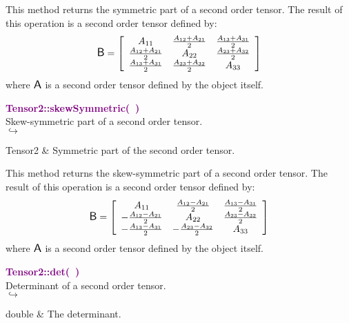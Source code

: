 This method returns the symmetric part of a second order tensor.
The result of this operation is a second order tensor defined by:
\begin{equation*}
\mbox{\large\ensuremath{\mathsf{B}}} = \left[\begin{array}{ccc}
 A_{11} & \frac{A_{12} + A_{21}}{2} & \frac{A_{13} + A_{31}}{2}\\
 \frac{A_{12} + A_{21}}{2} & A_{22} & \frac {A_{23} + A_{32}}{2}\\
 \frac{A_{13} + A_{31}}{2} & \frac {A_{23} + A_{32}}{2} & A_{33}\end{array}
\right]
\end{equation*}
where $\mbox{\large\ensuremath{\mathsf{A}}}$ is a second order tensor defined by the object itself.

\textcolor{purple}{\textbf{Tensor2::skewSymmetric(~)}}\label{Tensor2::skewSymmetric()}\\
Skew-symmetric part of a second order tensor.\\ \hspace*{5mm}$\hookrightarrow$
\vspace*{-2em}\begin{tcolorbox}[grow to left by=-1cm, width=\textwidth-1cm,myArgs,tabularx={l|R}]
Tensor2 & Symmetric part of the second order tensor.
\end{tcolorbox}

This method returns the skew-symmetric part of a second order tensor.
The result of this operation is a second order tensor defined by:
\begin{equation*}
\mbox{\large\ensuremath{\mathsf{B}}} = \left[\begin{array}{ccc}
 A_{11} & \frac{A_{12} - A_{21}}{2} & \frac{A_{13} - A_{31}}{2}\\
 -\frac{A_{12} -  A_{21}}{2} & A_{22} & \frac {A_{23} - A_{32}}{2}\\
 -\frac{A_{13} - A_{31}}{2} & -\frac {A_{23} - A_{32}}{2} & A_{33}\end{array}
\right]
\end{equation*}
where $\mbox{\large\ensuremath{\mathsf{A}}}$ is a second order tensor defined by the object itself.

\textcolor{purple}{\textbf{Tensor2::det(~)}}\label{Tensor2::det()}\\
Determinant of a second order tensor.\\ \hspace*{5mm}$\hookrightarrow$
\vspace*{-2em}\begin{tcolorbox}[grow to left by=-1cm, width=\textwidth-1cm,myArgs,tabularx={l|R}]
double & The determinant.
\end{tcolorbox}

